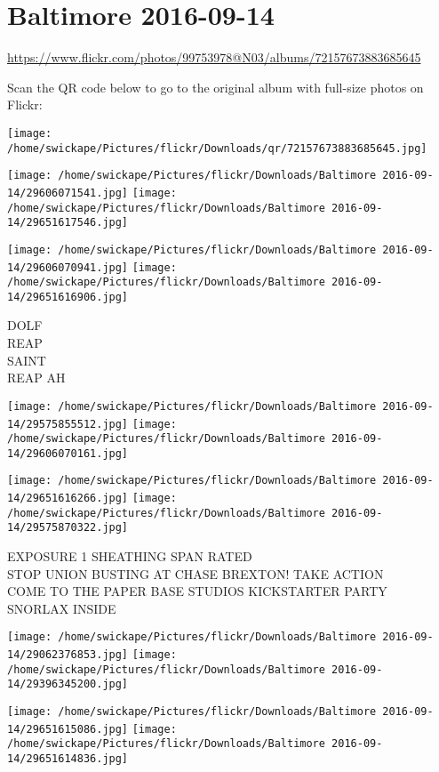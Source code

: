 \documentclass[10pt,letterpaper]{article}
\title{}
\author{}
\date{}
\begin{document}
\section*{Baltimore 2016-09-14}

\url{https://www.flickr.com/photos/99753978@N03/albums/72157673883685645}

Scan the QR code below to go to the original album with full-size photos on Flickr:

\texttt{[image: /home/swickape/Pictures/flickr/Downloads/qr/72157673883685645.jpg]}
\pagebreak

\texttt{[image: /home/swickape/Pictures/flickr/Downloads/Baltimore 2016-09-14/29606071541.jpg]}
\texttt{[image: /home/swickape/Pictures/flickr/Downloads/Baltimore 2016-09-14/29651617546.jpg]}

\texttt{[image: /home/swickape/Pictures/flickr/Downloads/Baltimore 2016-09-14/29606070941.jpg]}
\texttt{[image: /home/swickape/Pictures/flickr/Downloads/Baltimore 2016-09-14/29651616906.jpg]}

DOLF\\
REAP\\
SAINT\\
REAP AH
\pagebreak

\texttt{[image: /home/swickape/Pictures/flickr/Downloads/Baltimore 2016-09-14/29575855512.jpg]}
\texttt{[image: /home/swickape/Pictures/flickr/Downloads/Baltimore 2016-09-14/29606070161.jpg]}

\texttt{[image: /home/swickape/Pictures/flickr/Downloads/Baltimore 2016-09-14/29651616266.jpg]}
\texttt{[image: /home/swickape/Pictures/flickr/Downloads/Baltimore 2016-09-14/29575870322.jpg]}

EXPOSURE 1 SHEATHING SPAN RATED\\
STOP UNION BUSTING AT CHASE BREXTON!   TAKE ACTION\\
COME TO THE PAPER BASE STUDIOS KICKSTARTER PARTY\\
SNORLAX INSIDE
\pagebreak

\texttt{[image: /home/swickape/Pictures/flickr/Downloads/Baltimore 2016-09-14/29062376853.jpg]}
\texttt{[image: /home/swickape/Pictures/flickr/Downloads/Baltimore 2016-09-14/29396345200.jpg]}

\texttt{[image: /home/swickape/Pictures/flickr/Downloads/Baltimore 2016-09-14/29651615086.jpg]}
\texttt{[image: /home/swickape/Pictures/flickr/Downloads/Baltimore 2016-09-14/29651614836.jpg]}
\end{document}
